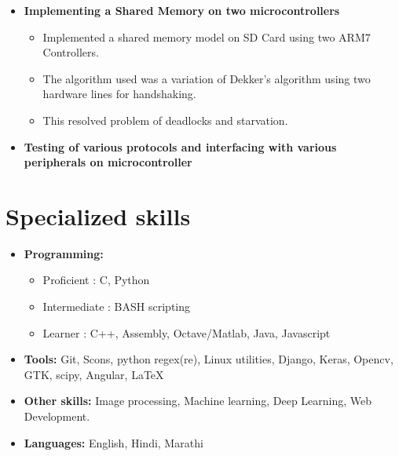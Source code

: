 \documentclass[10pt,a4paper,sans]{moderncv}        %
\begin{document}
\begin{itemize}
	
\item{\textbf{Implementing a Shared Memory on two microcontrollers}

\vspace{3pt}

		\small{
			\begin{itemize}
					\item Implemented a shared memory model on SD Card using two ARM7 Controllers.
					\item The algorithm used was a variation of Dekker's algorithm using two hardware lines for handshaking.
					\item This resolved problem of deadlocks and starvation.
			\end{itemize}
			}}

	\vspace{6pt}
	\item{\textbf{Testing of various protocols and interfacing with various peripherals on microcontroller}}

\end{itemize}

\section{Specialized skills}

\vspace{5pt}

\begin{itemize}

\item \textbf{Programming:} 
	\begin{itemize}
			\item Proficient : C, Python
			\item Intermediate : BASH scripting
			\item Learner : C++, Assembly, Octave/Matlab, Java, Javascript
	\end{itemize}

\vspace{3pt}

\item \textbf{Tools:} Git, Scons, python regex(re), Linux utilities, Django, Keras, Opencv, GTK, scipy, Angular, \LaTeX

\vspace{3pt}

\item \textbf{Other skills:}  Image processing, Machine learning, Deep Learning, Web Development.

\vspace{3pt}

\item \textbf{Languages:} English, Hindi, Marathi

\end{itemize}
\end{document}
